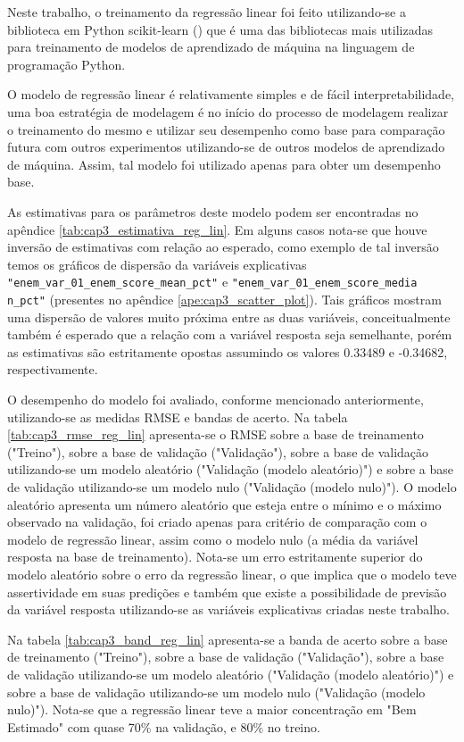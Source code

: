 Neste trabalho, o treinamento da regressão linear foi feito utilizando-se a biblioteca em Python scikit-learn (\citet{Sklearn}) que é uma das bibliotecas mais utilizadas para treinamento de modelos de aprendizado de máquina na linguagem de programação Python.

O modelo de regressão linear é relativamente simples e de fácil interpretabilidade, uma boa estratégia de modelagem é no início do processo de modelagem realizar o treinamento do mesmo e utilizar seu desempenho como base para comparação futura com outros experimentos utilizando-se de outros modelos de aprendizado de máquina. Assim, tal modelo foi utilizado apenas para obter um desempenho base.

As estimativas para os parâmetros deste modelo podem ser encontradas no apêndice \ref{tab:cap3_estimativa_reg_lin}. Em alguns casos nota-se que houve inversão de estimativas com relação ao esperado, como exemplo de tal inversão temos os gráficos de dispersão da variáveis explicativas \verb|"enem_var_01_enem_score_mean_pct"| e \verb|"enem_var_01_enem_score_media| \\ \verb|n_pct"| (presentes no apêndice \ref{ape:cap3_scatter_plot}). Tais gráficos mostram uma dispersão de valores muito próxima entre as duas variáveis, conceitualmente também é esperado que a relação com a variável resposta seja semelhante, porém as estimativas são estritamente opostas assumindo os valores 0.33489 e -0.34682, respectivamente.

O desempenho do modelo foi avaliado, conforme mencionado anteriormente, utilizando-se as medidas RMSE e bandas de acerto. Na tabela \ref{tab:cap3_rmse_reg_lin} apresenta-se o RMSE sobre a base de treinamento ("Treino"), sobre a base de validação ("Validação"), sobre a base de validação utilizando-se um modelo aleatório ("Validação (modelo aleatório)") e sobre a base de validação utilizando-se um modelo nulo ("Validação (modelo nulo)"). O modelo aleatório apresenta um número aleatório que esteja entre o mínimo e o máximo observado na validação, foi criado apenas para critério de comparação com o modelo de regressão linear, assim como o modelo nulo (a média da variável resposta na base de treinamento). Nota-se um erro estritamente superior do modelo aleatório sobre o erro da regressão linear, o que implica que o modelo teve assertividade em suas predições e também que existe a possibilidade de previsão da variável resposta utilizando-se as variáveis explicativas criadas neste trabalho.

Na tabela \ref{tab:cap3_band_reg_lin} apresenta-se a banda de acerto sobre a base de treinamento ("Treino"), sobre a base de validação ("Validação"), sobre a base de validação utilizando-se um modelo aleatório ("Validação (modelo aleatório)") e sobre a base de validação utilizando-se um modelo nulo ("Validação (modelo nulo)"). Nota-se que a regressão linear teve a maior concentração em "Bem Estimado" com quase 70\% na validação, e 80\% no treino.


